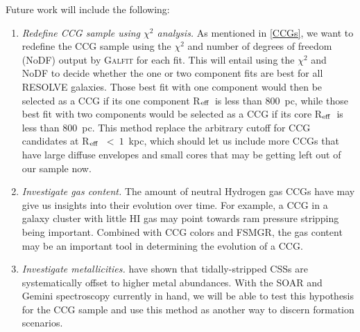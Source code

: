 \documentclass[iop,apj]{emulateapj}
\newcommand{\Reff}{R$_{\rm eff}$}
\begin{document}
  Future work will include the following:

\begin{enumerate}

\item \textit{Redefine CCG sample using $\chi^2$ analysis.} As mentioned in \autoref{CCGs}, we want to redefine the CCG sample using the $\chi^2$ and number of degrees of freedom (NoDF) output by \textsc{Galfit} for each fit. This will entail using the $\chi^2$ and NoDF to decide whether the one or two component fits are best for all RESOLVE galaxies. Those best fit with one component would then be selected as a CCG if its one component \Reff\ is less than 800~pc, while those best fit with two components would be selected as a CCG if its core \Reff\ is less than 800~pc. This method replace the arbitrary cutoff for CCG candidates at \Reff~$<~1$~kpc, which should let us include more CCGs that have large diffuse envelopes and small cores that may be getting left out of our sample now.

\item \textit{Investigate gas content.} The amount of neutral Hydrogen gas CCGs have may give us insights into their evolution over time. For example, a CCG in a galaxy cluster with little HI gas may point towards ram pressure stripping being important. Combined with CCG colors and FSMGR, the gas content may be an important tool in determining the evolution of a CCG.

\item \textit{Investigate metallicities.} \citet{Janz2015} have shown that tidally-stripped CSSs are systematically offset to higher metal abundances. With the SOAR and Gemini spectroscopy currently in hand, we will be able to test this hypothesis for the CCG sample and use this method as another way to discern formation scenarios.

\end{enumerate}





\appendix
\label{app}
\end{document}

